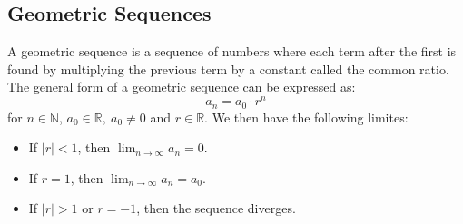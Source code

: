 \subsection{Geometric Sequences}
\begin{definition}
    A geometric sequence is a sequence of numbers where each term after the first is found by multiplying the previous term by a constant called the common ratio. The general form of a geometric sequence can be expressed as:
    \[
        a_n = a_0 \cdot r^{n}
    \]
    for \( n \in \mathbb{N} \), \( a_0 \in \mathbb{R}, \ a_0 \neq 0\) and \( r \in \mathbb{R} \). We then have the following limites:
    \begin{itemize}[itemsep=1pt,label=$\circ$]
        \item If \( |r| < 1 \), then \( \lim_{n \to \infty} a_n = 0 \).
        \item If \( r = 1 \), then \( \lim_{n \to \infty} a_n = a_0 \).
        \item If $|r| > 1$ or \( r = -1 \), then the sequence diverges.
    \end{itemize}
\end{definition}
